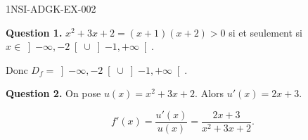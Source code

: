 \begin{corrige}{1NSI-ADGK-EX-002}

\textbf{Question 1.} $x^2+3x+2 = (x+1)(x+2) > 0$ si et seulement si $x \in \left]-\infty, -2\right[ \cup \left]-1, +\infty\right[$.

Donc $D_f = \left]-\infty, -2\right[ \cup \left]-1, +\infty\right[$.


\textbf{Question 2.} On pose $u(x) = x^2+3x+2$. Alors $u'(x) = 2x+3$.

\[ f'(x) = \frac{u'(x)}{u(x)} = \frac{2x+3}{x^2+3x+2}. \]

\end{corrige}
